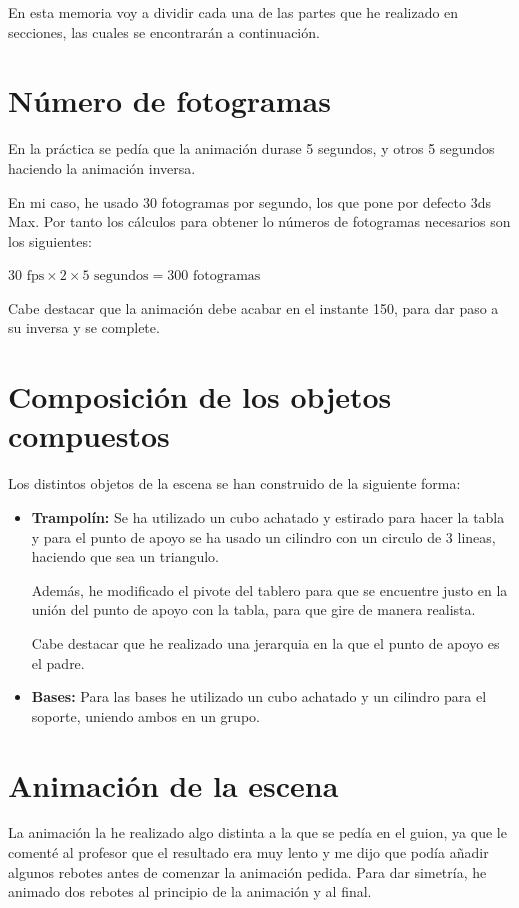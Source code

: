 \documentclass{article}
\begin{document}
En esta memoria voy a dividir cada una de las partes que he realizado en secciones, las cuales se encontrarán a continuación.

\section{Número de fotogramas}

En la práctica se pedía que la animación durase 5 segundos, y otros 5 segundos haciendo la animación inversa. 

En mi caso, he usado 30 fotogramas por segundo, los que pone por defecto 3ds Max. Por tanto los cálculos para obtener lo números de fotogramas necesarios son los siguientes:


$30 \text{ fps} \times 2 \times 5 \text{ segundos} = 300 \text{ fotogramas} $

Cabe destacar que la animación debe acabar en el instante 150, para dar paso a su inversa y se complete.

\section{Composición de los objetos compuestos}

Los distintos objetos de la escena se han construido de la siguiente forma:

\begin{itemize}
    \item \textbf{Trampolín: }Se ha utilizado un cubo achatado y estirado para hacer la tabla y para el punto de apoyo se ha usado un cilindro con un circulo de 3 lineas, haciendo que sea un triangulo.
    
    Además, he modificado el pivote del tablero para que se encuentre justo en la unión del punto de apoyo con la tabla, para que gire de manera realista.

    Cabe destacar que he realizado una jerarquia en la que el punto de apoyo es el padre.

    \item \textbf{Bases: }Para las bases he utilizado un cubo achatado y un cilindro para el soporte, uniendo ambos en un grupo.
\end{itemize}


\section{Animación de la escena}

La animación la he realizado algo distinta a la que se pedía en el guion, ya que le comenté al profesor que el resultado era muy lento y me dijo que podía añadir algunos rebotes antes de comenzar la animación pedida. Para dar simetría, he animado dos rebotes al principio de la animación y al final. 
\end{document}
